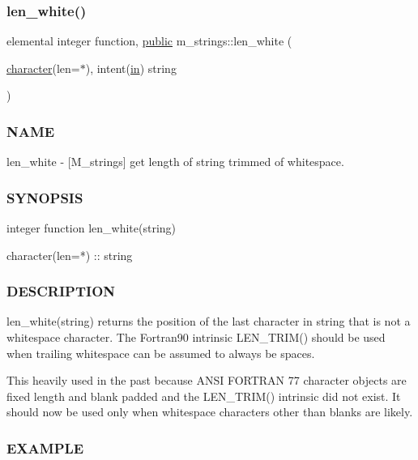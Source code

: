 \subsubsection{\texorpdfstring{len\+\_\+white()}{len\_white()}}
{\footnotesize\ttfamily elemental integer function, \hyperlink{M__stopwatch_83_8txt_a2f74811300c361e53b430611a7d1769f}{public} m\+\_\+strings\+::len\+\_\+white (\begin{DoxyParamCaption}\item[{\hyperlink{option__stopwatch_83_8txt_abd4b21fbbd175834027b5224bfe97e66}{character}(len=$\ast$), intent(\hyperlink{M__journal_83_8txt_afce72651d1eed785a2132bee863b2f38}{in})}]{string }\end{DoxyParamCaption})}



\subsubsection*{N\+A\+ME}

len\+\_\+white -\/ \mbox{[}M\+\_\+strings\mbox{]} get length of string trimmed of whitespace. 

\subsubsection*{S\+Y\+N\+O\+P\+S\+IS}

\begin{DoxyVerb}integer function len_white(string)

 character(len=*) :: string
\end{DoxyVerb}


\subsubsection*{D\+E\+S\+C\+R\+I\+P\+T\+I\+ON}

\begin{DoxyVerb}  len_white(string) returns the position of the last
  character in string that is not a whitespace character.
  The Fortran90 intrinsic LEN_TRIM() should be used when
  trailing whitespace can be assumed to always be spaces.

  This heavily used in the past because ANSI FORTRAN 77
  character objects are fixed length and blank padded and
  the LEN_TRIM() intrinsic did not exist. It should now
  be used only when whitespace characters other than blanks
  are likely.
\end{DoxyVerb}


\subsubsection*{E\+X\+A\+M\+P\+LE}

